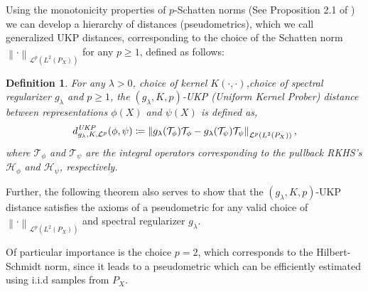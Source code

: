 \documentclass{article} %
\newcommand{\repone}{\phi}
\newcommand{\reptwo}{\psi}
\newcommand{\Hone}{\mathcal{H}_{\phi}}
\newcommand{\Htwo}{\mathcal{H}_{\psi}}
\newcommand{\Tone}{\mathcal{T}_{\repone}}
\newcommand{\Ttwo}{\mathcal{T}_{\reptwo}}
\newcommand{\gl}{g_{\lambda}}
\newcommand{\norm}[1]{\left\|#1\right\|}
\newcommand{\LPtwo}{L^{2}(P_{X})}
\newcommand{\Lptwo}{\mathcal{L}^{p}(\LPtwo)}
\newcommand{\metricstname}{UKP }
\newcommand{\metricfullname}{Uniform Kernel Prober}
\newcommand{\dLpgl}{d_{\gl,K,\mathcal{L}^{p}}^{\emph{\metricstname}}}
\theoremstyle{plain}
\newcounter{definitionno}
\newtheorem{definition}[definitionno]{Definition}
\begin{document}
Using the monotonicity properties of $p$-Schatten norms (See Proposition 2.1 of \citet{pfeiffer2021stability}) we can develop a hierarchy of distances (pseudometrics), which we call generalized \metricstname distances, corresponding to the choice of the Schatten norm $\norm{\cdot}_{\Lptwo}$ for any $ p \geq 1$, defined as follows:
\begin{definition}\label{Definition of pseudometric Lp norm general case}
    For any $\lambda>0$, choice of kernel $K(\cdot,\cdot)$,choice of spectral regularizer $\gl$ and $p \geq 1$, the $(\gl,K,p)$-\metricstname (\metricfullname) distance between representations $\repone(X)$ and $\reptwo(X)$ is defined as, 
    \[
    \dLpgl(\repone,\reptwo) \coloneq \norm{\gl(\Tone) \Tone - \gl(\Ttwo) \Ttwo}_{\Lptwo},
    \]
    where $\Tone$ and $\Ttwo$ are the integral operators corresponding to the pullback RKHS's $\Hone$ and $\Htwo$, respectively.
\end{definition}

Further, the following theorem also serves to show that the $(\gl,K,p)$-\metricstname distance satisfies the axioms of a pseudometric for any valid choice of $\norm{\cdot}_{\Lptwo}$ and spectral regularizer $\gl$.


Of particular importance is the choice $p=2$, which corresponds to the Hilbert-Schmidt norm, since it leads to a pseudometric which can be efficiently estimated using i.i.d samples from $P_X$.
\end{document}
